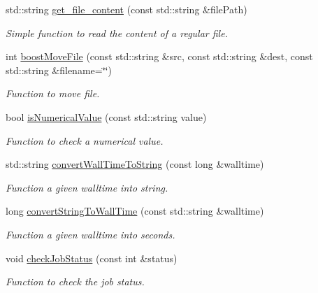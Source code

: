 \begin{DoxyCompactItemize}
std::string \hyperlink{namespacevishnu_a50b77ca8a04c384cba2b8b6cdec4a26f}{get\_\-file\_\-content} (const std::string \&filePath)
\begin{DoxyCompactList}\small\item\em Simple function to read the content of a regular file. \item\end{DoxyCompactList}\item 
int \hyperlink{namespacevishnu_a0e3a3913b049d96a08712f45d71e86cb}{boostMoveFile} (const std::string \&src, const std::string \&dest, const std::string \&filename=\char`\"{}\char`\"{})
\begin{DoxyCompactList}\small\item\em Function to move file. \item\end{DoxyCompactList}\item 
bool \hyperlink{namespacevishnu_a8087df6ef072800cecc1bf4e85d9aca5}{isNumericalValue} (const std::string value)
\begin{DoxyCompactList}\small\item\em Function to check a numerical value. \item\end{DoxyCompactList}\item 
std::string \hyperlink{namespacevishnu_ad5bea19658f717e721e13dacad591b2a}{convertWallTimeToString} (const long \&walltime)
\begin{DoxyCompactList}\small\item\em Function a given walltime into string. \item\end{DoxyCompactList}\item 
long \hyperlink{namespacevishnu_aed3383125fa0df584941fc4dac560e9e}{convertStringToWallTime} (const std::string \&walltime)
\begin{DoxyCompactList}\small\item\em Function a given walltime into seconds. \item\end{DoxyCompactList}\item 
void \hyperlink{namespacevishnu_a8460fc46c76d0b8e7efedbc571487d1f}{checkJobStatus} (const int \&status)
\begin{DoxyCompactList}\small\item\em Function to check the job status. \item\end{DoxyCompactList}\item 

\end{DoxyCompactItemize}
